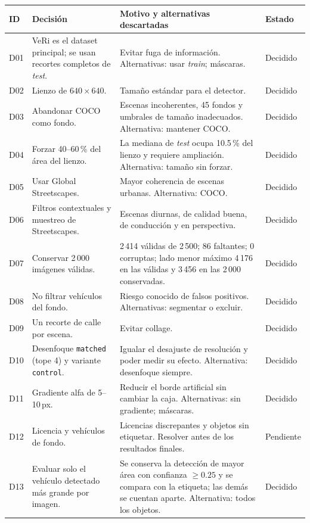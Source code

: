 \documentclass[11pt,a4paper]{article}
\begin{document}
{\small
\begin{longtable}{@{}p{0.9cm}p{4.6cm}p{7.2cm}p{1.8cm}@{}}
\toprule
ID & Decisi\'on & Motivo y alternativas descartadas & Estado \\
\midrule
\endhead
D01 & VeRi es el dataset principal; se usan recortes completos de \emph{test}. & Evitar fuga de informaci\'on. Alternativas: usar \emph{train}; m\'ascaras. & Decidido \\
D02 & Lienzo de $640\times640$. & Tama\~no est\'andar para el detector. & Decidido \\
D03 & Abandonar COCO como fondo. & Escenas incoherentes, 45 fondos y umbrales de tama\~no inadecuados. Alternativa: mantener COCO. & Decidido \\
D04 & Forzar 40--60\,\% del \'area del lienzo. & La mediana de \emph{test} ocupa 10.5\,\% del lienzo y requiere ampliaci\'on. Alternativa: tama\~no sin forzar. & Decidido \\
D05 & Usar Global Streetscapes. & Mayor coherencia de escenas urbanas. Alternativa: COCO. & Decidido \\
D06 & Filtros contextuales y muestreo de Streetscapes. & Escenas diurnas, de calidad buena, de conducci\'on y en perspectiva. & Decidido \\
D07 & Conservar 2\,000 im\'agenes v\'alidas. & 2\,414 v\'alidas de 2\,500; 86 faltantes; 0 corruptas; lado menor m\'aximo 4\,176 en las v\'alidas y 3\,456 en las 2\,000 conservadas. & Decidido \\
D08 & No filtrar veh\'iculos del fondo. & Riesgo conocido de falsos positivos. Alternativas: segmentar o excluir. & Decidido \\
D09 & Un recorte de calle por escena. & Evitar collage. & Decidido \\
D10 & Desenfoque \texttt{matched} (tope 4) y variante \texttt{control}. & Igualar el desajuste de resoluci\'on y poder medir su efecto. Alternativa: desenfoque siempre. & Decidido \\
D11 & Gradiente alfa de 5--10\,px. & Reducir el borde artificial sin cambiar la caja. Alternativas: sin gradiente; m\'ascaras. & Decidido \\
D12 & Licencia y veh\'iculos de fondo. & Licencias discrepantes y objetos sin etiquetar. Resolver antes de los resultados finales. & Pendiente \\
D13 & Evaluar solo el veh\'iculo detectado m\'as grande por imagen. & Se conserva la detecci\'on de mayor \'area con confianza $\geq 0.25$ y se compara con la etiqueta; las dem\'as se cuentan aparte. Alternativa: todos los objetos. & Decidido \\
\bottomrule
\end{longtable}
}
\end{document}
